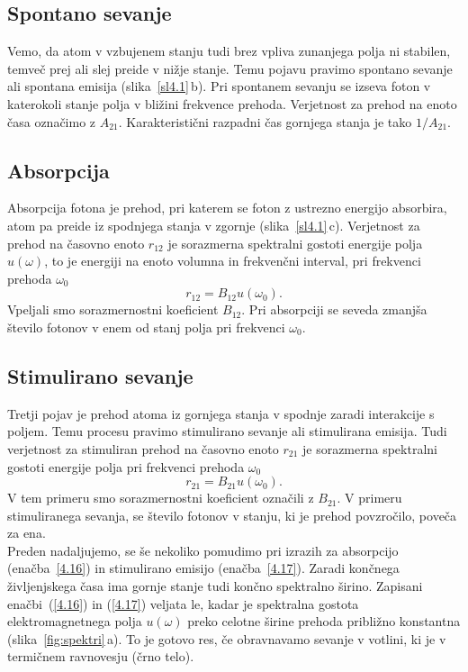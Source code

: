 \subsection*{Spontano sevanje}
Vemo, da atom v vzbujenem stanju tudi brez vpliva zunanjega polja
ni stabilen, temveč prej ali slej preide v nižje stanje. Temu pojavu
pravimo spontano sevanje ali spontana emisija (slika~\ref{sl4.1}\,b). 
Pri spontanem sevanju se izseva foton v katerokoli stanje polja v bližini 
frekvence prehoda. Verjetnost za prehod na enoto časa označimo z $A_{21}$.
Karakteristični razpadni čas gornjega stanja je tako
$1/A_{21}$.

\subsection*{Absorpcija}
Absorpcija fotona je prehod, pri katerem se foton 
z ustrezno energijo absorbira, atom pa preide iz spodnjega stanja v zgornje (slika~\ref{sl4.1}\,c). 
Verjetnost za prehod na časovno enoto $r_{12}$ je sorazmerna spektralni gostoti
energije polja $u(\omega)$, to je energiji na enoto volumna in frekvenčni interval, 
pri frekvenci prehoda $\omega_{0}$
\begin{equation}
r_{12}=B_{12}u(\omega_{0}).
\label{4.16}
\end{equation}
Vpeljali smo sorazmernostni koeficient $B_{12}$. Pri absorpciji se
seveda zmanjša število fotonov v enem od stanj polja pri frekvenci
$\omega_{0}$.

\subsection*{Stimulirano sevanje}
Tretji pojav je prehod atoma iz gornjega stanja v spodnje zaradi interakcije
s poljem. Temu procesu pravimo stimulirano sevanje ali 
stimulirana emisija. Tudi verjetnost za stimuliran prehod na časovno enoto $r_{21}$ 
je sorazmerna spektralni gostoti energije polja pri frekvenci prehoda $\omega_{0}$
\begin{equation}
r_{21}=B_{21}u(\omega_{0}).
\label{4.17}
\end{equation}
V tem primeru smo sorazmernostni koeficient označili z $B_{21}$. V primeru
stimuliranega sevanja, se število fotonov v stanju, ki je prehod povzročilo, poveča za ena. \\

\noindent
Preden nadaljujemo, se še nekoliko pomudimo pri izrazih za absorpcijo
(enačba~\ref{4.16}) in stimulirano emisijo (enačba~\ref{4.17}).
Zaradi končnega življenjskega časa ima gornje
stanje tudi končno spektralno širino. Zapisani enačbi~(\ref{4.16}) in (\ref{4.17})
veljata le, kadar je spektralna gostota elektromagnetnega polja $u(\omega)$
preko celotne širine prehoda približno konstantna (slika~\ref{fig:spektri}\,a). To je gotovo res, če
obravnavamo sevanje v votlini, ki je v termičnem ravnovesju (črno telo). \\

